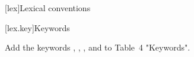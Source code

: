 
[lex]{Lexical conventions}

\setcounter{section}{11}
[lex.key]{Keywords}

Add the keywords ,
, , and
 to Table~4 "Keywords".

